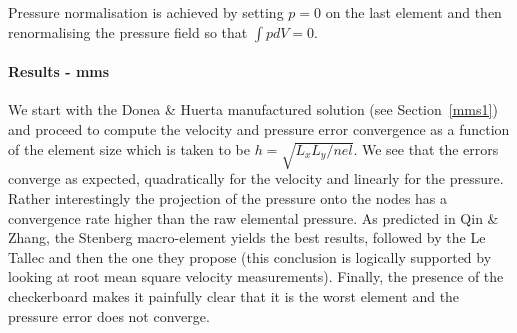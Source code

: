Pressure normalisation is achieved by setting $p=0$ on the last element and then 
renormalising the pressure field so that $\int p dV=0$.

\paragraph{Results - mms}

We start with the Donea \& Huerta manufactured solution (see Section~\ref{mms1}) and 
proceed to compute the velocity and pressure error convergence as a function of the 
element size which is taken to be $h = \sqrt{L_xL_y/nel}$. We see that 
the errors converge as expected, quadratically for the velocity and linearly for the pressure.
Rather interestingly the projection of the pressure onto the nodes has a convergence rate 
higher than the raw elemental pressure. As predicted in Qin \& Zhang, the Stenberg macro-element 
yields the best results, followed by the Le Tallec and then the one they propose (this conclusion 
is logically supported by looking at root mean square velocity measurements). 
Finally, the presence of the checkerboard makes it painfully clear that it is the worst element 
and the pressure error does not converge.  

